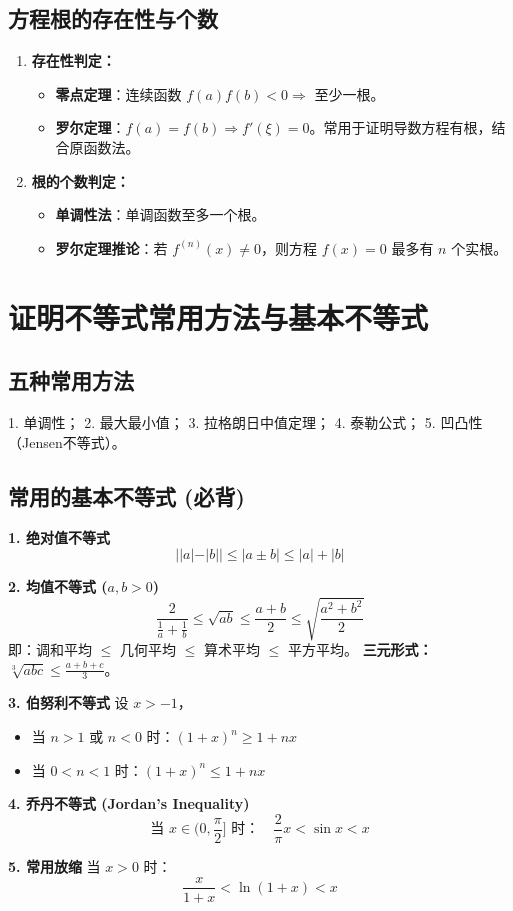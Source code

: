 \documentclass[a4paper,12pt]{ctexart}
\newenvironment{rednote}
  {\begin{tcolorbox}[colback=notepurple, colframe=highlightred, boxrule=1pt, title=\textbf{重点/技巧/手写笔记}]}
  {\end{tcolorbox}}
\begin{document}
\subsection{方程根的存在性与个数}
\begin{enumerate}
    \item \textbf{存在性判定：}
    \begin{itemize}
        \item \textbf{零点定理}：连续函数 $f(a)f(b) < 0 \Rightarrow$ 至少一根。
        \item \textbf{罗尔定理}：$f(a)=f(b) \Rightarrow f'(\xi)=0$。常用于证明导数方程有根，结合原函数法。
    \end{itemize}
    \item \textbf{根的个数判定：}
    \begin{itemize}
        \item \textbf{单调性法}：单调函数至多一个根。
        \item \textbf{罗尔定理推论}：若 $f^{(n)}(x) \neq 0$，则方程 $f(x)=0$ 最多有 $n$ 个实根。
    \end{itemize}
\end{enumerate}

\section{证明不等式常用方法与基本不等式}

\subsection{五种常用方法}
1. 单调性； 2. 最大最小值； 3. 拉格朗日中值定理； 4. 泰勒公式； 5. 凹凸性（Jensen不等式）。

\subsection{常用的基本不等式 (必背)}

\begin{rednote}
\textbf{1. 绝对值不等式}
\[ ||a| - |b|| \le |a \pm b| \le |a| + |b| \]

\textbf{2. 均值不等式 ($a, b > 0$)}
\[ \frac{2}{\frac{1}{a} + \frac{1}{b}} \le \sqrt{ab} \le \frac{a+b}{2} \le \sqrt{\frac{a^2+b^2}{2}} \]
即：调和平均 $\le$ 几何平均 $\le$ 算术平均 $\le$ 平方平均。
\textbf{三元形式：} $\sqrt[3]{abc} \le \frac{a+b+c}{3}$。

\textbf{3. 伯努利不等式}
设 $x > -1$，
\begin{itemize}
    \item 当 $n > 1$ 或 $n < 0$ 时：$(1+x)^n \ge 1+nx$
    \item 当 $0 < n < 1$ 时：$(1+x)^n \le 1+nx$
\end{itemize}

\textbf{4. 乔丹不等式 (Jordan's Inequality)}
\[ \text{当 } x \in (0, \frac{\pi}{2}] \text{ 时：} \quad \frac{2}{\pi}x < \sin x < x \]

\textbf{5. 常用放缩}
当 $x > 0$ 时：
\[ \frac{x}{1+x} < \ln(1+x) < x \]
\end{rednote}
\newpage
\end{document}
